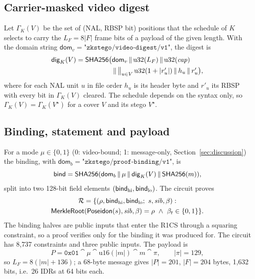 \subsection{Carrier-masked video digest}
Let $\Gamma_K(V)$ be the set of (NAL, RBSP bit) positions that the schedule of $K$ selects to carry the $L_F=8|F|$ frame bits of a payload of the given length. With the domain string $\mathsf{dom}_v=\texttt{"zkstego/video-digest/v1"}$, the digest is
\begin{align}
\mathsf{dig}_K(V)=\mathsf{SHA256}\big(&\mathsf{dom}_v\,\|\,\mathrm{u32}(L_F)\,\|\,\mathrm{u32}(\mathit{cap})\nonumber\\
&\,\|\,\textstyle\big\|_{u\in V}\,\mathrm{u32}(1+|r'_u|)\,\|\, h_u\,\|\, r'_u\big),
\label{eq:digest}
\end{align}
where for each NAL unit $u$ in file order $h_u$ is its header byte and $r'_u$ its RBSP with every bit in $\Gamma_K(V)$ cleared. The schedule depends on the syntax only, so $\Gamma_K(V)=\Gamma_K(V^{\star})$ for a cover $V$ and its stego $V^{\star}$.

\subsection{Binding, statement and payload}
For a mode $\mu\in\{0,1\}$ (0: video-bound; 1: message-only, Section~\ref{sec:discussion}) the binding, with $\mathsf{dom}_b=\texttt{"zkstego/proof-binding/v1"}$, is
\begin{equation}
\mathsf{bind}=\mathsf{SHA256}(\mathsf{dom}_b\,\|\,\mu\,\|\, \mathsf{dig}_K(V)\,\|\,\mathsf{SHA256}(m)),
\end{equation}
split into two 128-bit field elements $(\mathsf{bind}_{\mathrm{hi}},\mathsf{bind}_{\mathrm{lo}})$. The circuit proves
\begin{multline}
\mathcal R=\{(\rho,\bind_{\mathrm{hi}},\bind_{\mathrm{lo}};\ s,\mathit{sib},\beta):\\
\mathsf{MerkleRoot}(\Pos(s),\mathit{sib},\beta)=\rho\ \wedge\ \beta_t\in\{0,1\}\}.
\end{multline}
The binding halves are public inputs that enter the R1CS through a squaring constraint, so a proof verifies only for the binding it was produced for. The circuit has 8{,}737 constraints and three public inputs. The payload is
\begin{equation}
P=\texttt{0x01}\cat\mu\cat\mathrm{u16}(|m|)\cat m\cat\pi,\qquad|\pi|=129,
\end{equation}
so $L_F=8(|m|+136)$; a 68-byte message gives $|P|=201$, $|F|=204$ bytes, 1{,}632 bits, i.e.\ 26 IDRs at 64 bits each.

